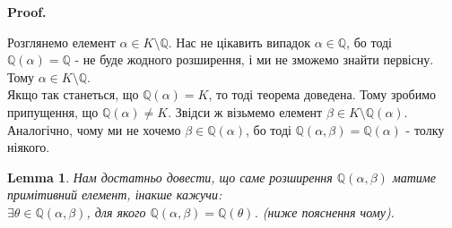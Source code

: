 \documentclass[a4paper, 10pt]{article}
\makeatletter
\theoremstyle{theoremdd}
\theoremstyle{theoremdd}
\theoremstyle{theoremdd}
\theoremstyle{theoremdd}
\theoremstyle{theoremdd}
\theoremstyle{theoremdd}
\theoremstyle{theoremdd}
\newtheorem{lemma}[theorem]{Lemma}
\theoremstyle{theoremdd}
\renewenvironment{proof}[1][Proof.\\]{\par
\pushQED{\hfill \qed}%
\normalfont \topsep6\p@\@plus6\p@\relax
\trivlist
\item\relax
{\bfseries
#1\@addpunct{.}}\hspace\labelsep\ignorespaces
}{%
\popQED\endtrivlist\@endpefalse
}
\makeatother
\begin{document}
\begin{proof}
Розглянемо елемент $\alpha \in K \setminus \mathbb{Q}$. Нас не цікавить випадок $\alpha \in \mathbb{Q}$, бо тоді $\mathbb{Q}(\alpha) = \mathbb{Q}$ - не буде жодного розширення, і ми не зможемо знайти первісну. Тому $\alpha \in K \setminus \mathbb{Q}$.\\
Якщо так станеться, що $\mathbb{Q}(\alpha) = K$, то тоді теорема доведена. Тому зробимо припущення, що $\mathbb{Q}(\alpha) \neq K$. Звідси ж візьмемо елемент $\beta \in K \setminus \mathbb{Q}(\alpha)$. Аналогічно, чому ми не хочемо $\beta \in \mathbb{Q}(\alpha)$, бо тоді $\mathbb{Q}(\alpha,\beta) = \mathbb{Q}(\alpha)$ - толку ніякого.

\begin{lemma}
Нам достатньо довести, що саме розширення $\mathbb{Q}(\alpha,\beta)$ матиме примітивний елемент, інакше кажучи:\\
$\exists \theta \in \mathbb{Q}(\alpha,\beta)$, для якого $\mathbb{Q}(\alpha,\beta) = \mathbb{Q}(\theta)$. (ниже пояснення чому).
\end{lemma}


\end{proof}
\end{document}
